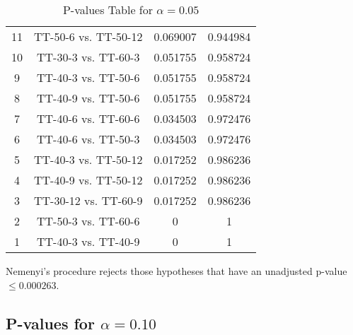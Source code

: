 \documentclass[a4paper,10pt]{article}
\begin{document}
\begin{landscape}
\begin{table}[!htp]
\begin{tabular}{cccc}
11&TT-50-6 vs. TT-50-12&0.069007&0.944984\\
10&TT-30-3 vs. TT-60-3&0.051755&0.958724\\
9&TT-40-3 vs. TT-50-6&0.051755&0.958724\\
8&TT-40-9 vs. TT-50-6&0.051755&0.958724\\
7&TT-40-6 vs. TT-60-6&0.034503&0.972476\\
6&TT-40-6 vs. TT-50-3&0.034503&0.972476\\
5&TT-40-3 vs. TT-50-12&0.017252&0.986236\\
4&TT-40-9 vs. TT-50-12&0.017252&0.986236\\
3&TT-30-12 vs. TT-60-9&0.017252&0.986236\\
2&TT-50-3 vs. TT-60-6&0&1\\
1&TT-40-3 vs. TT-40-9&0&1\\
\hline
\end{tabular}
\caption{P-values Table for $\alpha=0.05$}
\end{table}Nemenyi's procedure rejects those hypotheses that have an unadjusted p-value $\le0.000263$.

\pagebreak

\subsection{P-values for $\alpha=0.10$}


\end{landscape}
\end{document}
